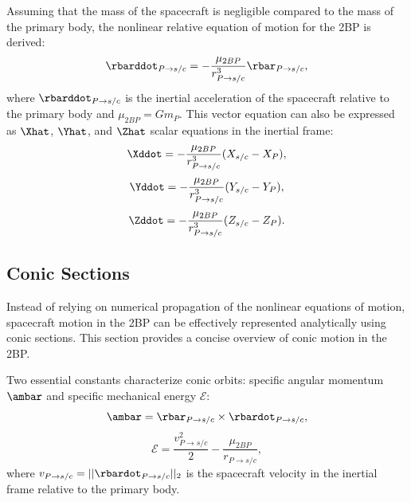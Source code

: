 Assuming that the mass of the spacecraft is negligible compared to the mass of the primary body,
the nonlinear relative equation of motion for the 2BP is derived\cite{Vallado:2013, Canales:2021}:
\begin{equation}
    \rbarddot_{P\rightarrow s/c}=-\frac{\mu_{2BP}}{r_{P\rightarrow s/c}^{3}}\rbar_{P\rightarrow s/c},
    \label{eq:TBPEoM}
\end{equation}
where $\rbarddot_{P\rightarrow s/c}$ is the inertial acceleration of the spacecraft relative to the
primary body and $\mu_{2BP}=Gm_{P}$. This vector equation can also be expressed as $\Xhat$,
$\Yhat$, and $\Zhat$ scalar equations in the inertial frame:
\begin{equation}
    \Xddot=-\frac{\mu_{2BP}}{r_{P\rightarrow s/c}^{3}}(X_{s/c}-X_{P}),
    \label{eq:TBPEoMX}
\end{equation}
\begin{equation}
    \Yddot=-\frac{\mu_{2BP}}{r_{P\rightarrow s/c}^{3}}(Y_{s/c}-Y_{P}),
    \label{eq:TBPEoMY}
\end{equation}
\begin{equation}
    \Zddot=-\frac{\mu_{2BP}}{r_{P\rightarrow s/c}^{3}}(Z_{s/c}-Z_{P}).
    \label{eq:TBPEoMZ}
\end{equation}

\subsection{Conic Sections}
Instead of relying on numerical propagation of the nonlinear equations of motion, spacecraft motion
in the 2BP can be effectively represented analytically using conic sections. This section provides
a concise overview of conic motion in the 2BP.

Two essential constants characterize conic orbits: specific angular momentum $\ambar$ and specific
mechanical energy $\mathcal{E}$:
\begin{equation}
    \ambar=\rbar_{P\rightarrow s/c}\times\rbardot_{P\rightarrow s/c},
    \label{eq:angularmomentum}
\end{equation}
\begin{equation}
    \mathcal{E}=\frac{v_{P\rightarrow s/c}^{2}}{2}-\frac{\mu_{2BP}}{r_{P\rightarrow s/c}},
    \label{eq:energy}
\end{equation}
where $v_{P\rightarrow s/c}=||\rbardot_{P\rightarrow s/c}||_{2}$ is the spacecraft velocity in the
inertial frame relative to the primary body.

